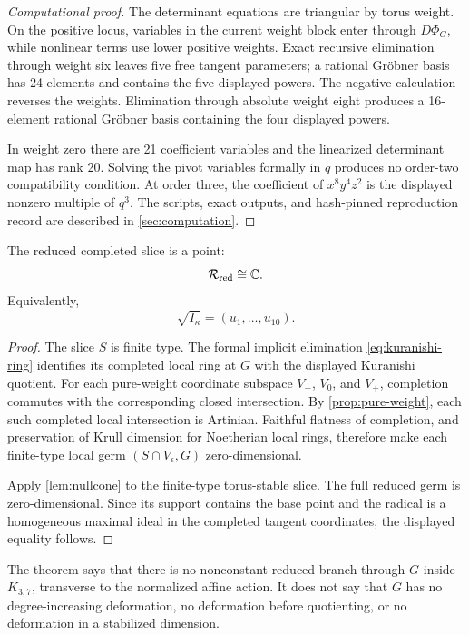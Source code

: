 \documentclass[11pt,reqno]{amsart}
\begin{document}
\begin{proof}[Computational proof]
The determinant equations are triangular by torus weight.  On the positive
locus, variables in the current weight block enter through \(D\Phi_G\),
while nonlinear terms use lower positive weights.  Exact recursive
elimination through weight six leaves five free tangent parameters; a
rational Gr\"obner basis has 24 elements and contains the five displayed
powers.  The negative calculation reverses the weights.  Elimination through
absolute weight eight produces a 16-element rational Gr\"obner basis
containing the four displayed powers.

In weight zero there are 21 coefficient variables and the linearized
determinant map has rank 20.  Solving the pivot variables formally in \(q\)
produces no order-two compatibility condition.  At order three, the
coefficient of \(x^8y^4z^2\) is the displayed nonzero multiple of \(q^3\).
The scripts, exact outputs, and hash-pinned reproduction record are described
in \cref{sec:computation}.
\end{proof}

\begin{theorem}
\label{thm:reduced}
The reduced completed slice is a point:
\[
\mathcal R_{\mathrm{red}}\cong\mathbb C.
\]
Equivalently,
\[
\sqrt{I_\kappa}=(u_1,\ldots,u_{10}).
\]
\end{theorem}

\begin{proof}
The slice \(S\) is finite type.  The formal implicit elimination
\eqref{eq:kuranishi-ring} identifies its completed local ring at \(G\) with
the displayed Kuranishi quotient.  For each pure-weight coordinate
subspace \(V_-\), \(V_0\), and \(V_+\), completion commutes with the
corresponding closed intersection.  By \cref{prop:pure-weight}, each such
completed local intersection is Artinian.  Faithful flatness of completion,
and preservation of Krull dimension for Noetherian local rings, therefore
make each finite-type local germ \((S\cap V_\epsilon,G)\) zero-dimensional.

Apply \cref{lem:nullcone} to the finite-type torus-stable slice.  The full
reduced germ is zero-dimensional.  Since its support contains the base point
and the radical is a homogeneous maximal ideal in the completed tangent
coordinates, the displayed equality follows.
\end{proof}

\begin{remark}
\label{rem:scope}
The theorem says that there is no nonconstant reduced branch through \(G\)
inside \(K_{3,7}\), transverse to the normalized affine action.  It does not
say that \(G\) has no degree-increasing deformation, no deformation before
quotienting, or no deformation in a stabilized dimension.
\end{remark}
\end{document}
